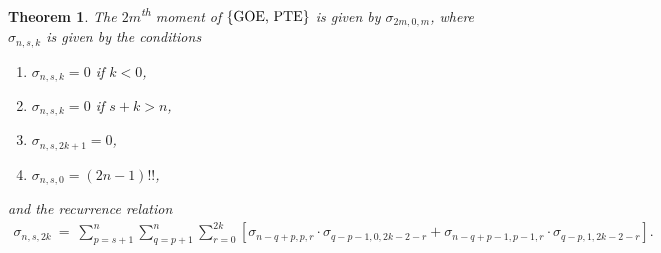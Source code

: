 \documentclass[11pt,reqno]{amsart}
\numberwithin{equation}{section}
\theoremstyle{plain}
\newtheorem{theorem}[thm]{Theorem}
\begin{document}
\begin{theorem}\label{sigmarecurrence}
The $2m$\textsuperscript{th} moment of $\{\textup{GOE, PTE}\}$ is given by $\sigma_{2m, 0, m}$, where $\sigma_{n, s, k}$ is given by the conditions
\begin{enumerate}
\item $\sigma_{n, s, k}=0$ if $k<0$,
\item $\sigma_{n, s, k}=0$ if $s+k>n$,
\item $\sigma_{n, s, 2k+1}=0$,
\item $\sigma_{n, s, 0}=(2n-1)!!$,
\end{enumerate}
and the recurrence relation
\begin{align}
\sigma_{n, s, 2k} \ = \ \sum_{p=s+1}^n \sum_{q=p+1}^n \sum_{r=0}^{2k}\left[
\sigma_{n-q+p, p, r}\cdot\sigma_{q-p-1, 0, 2k-2-r}+\sigma_{n-q+p-1, p-1, r}\cdot\sigma_{q- p, 1, 2k-2-r}
\right].
\end{align}
\end{theorem}
\end{document}
